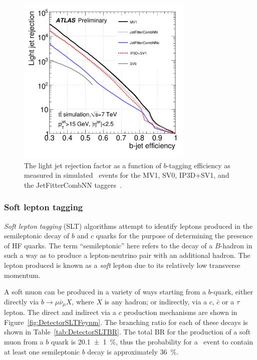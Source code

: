 \begin{figure}[htbp]
  \centering
  \includegraphics[width=0.75\textwidth]{PartDetector/Plots/MV1Perf.pdf}
  \caption[The light jet rejection factor as a function of $b$-tagging efficiency as measured in simulated \ttbar\ events for the MV1, SV0, IP3D+SV1, and the JetFitterCombNN taggers.]{The light jet rejection factor as a function of $b$-tagging efficiency as measured in simulated \ttbar\ events for the MV1, SV0, IP3D+SV1, and the JetFitterCombNN taggers~\cite{Detector:MV1TaggerEffs}.}\label{fig:DetectorMV1Perf}
\end{figure}

\subsubsection{Soft lepton tagging}\label{sec:DetectorSLT}

\emph{Soft lepton tagging} (SLT) algorithms attempt to identify leptons produced in the semileptonic decay of $b$ and $c$ quarks for the purpose of determining the presence of HF quarks. The term ``semileptonic'' here refers to the decay of a $B$-hadron in such a way as to produce a lepton-neutrino pair with an additional hadron. The lepton produced is known as a \emph{soft} lepton due to its relatively low transverse momentum.

A soft muon can be produced in a variety of ways starting from a $b$-quark, either directly via $b\rightarrow \mu\bar{\nu}_{\mu}X$, where $X$ is any hadron; or indirectly, via a $c$, $\bar{c}$ or a $\tau$ lepton. The direct and indirect via a $c$ production mechanisms are shown in Figure~\ref{fig:DetectorSLTFeynm}. The branching ratio for each of these decays is shown in Table~\ref{tab:DetectorSLTBR}. The total BR for the production of a soft muon from a $b$ quark is \SI[multi-part-units=single]{20.1(10)}{\percent}, thus the probability for a \ttbar\ event to contain at least one semileptonic $b$ decay is approximately \SI{36}{\percent}.

